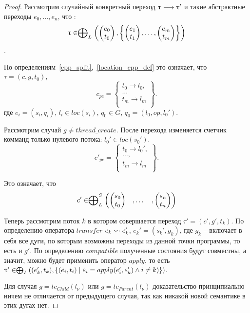 \begin{proof}
Рассмотрим случайный конкретный переход $\uptau \longrightarrow \uptau'$ и такие абстрактные переходы $e_0, \dots, e_n$, что :
$$\uptau \in \mathrel{\bigoplus}_{L}
\left(
\begin{pmatrix}
e_0 \\
t_0 
\end{pmatrix},
\left\{
\begin{pmatrix}
e_1 \\
t_1 
\end{pmatrix},
\dots ,
\begin{pmatrix}
e_m \\
t_m 
\end{pmatrix}
\right\}
\right)$$.

По определениям~\ref{epp_split},~\ref{location_epp_def} это означает, что $\tau = (c, g, t_0)$,  
$$ c_{pc} = 
\left\lbrace
\begin{array}{c}
t_0 \to l_0,\\
\dots\\
t_m \to l_m\\
\end{array}
\right\rbrace.$$
где $e_i = (s_i, q_i)$, $l_i \in loc(s_i)$, $q_0 \in G$, $q_0 = (l_0, op, l_0')$.

Рассмотрим случай $g \neq thread\_create$. После перехода изменяется счетчик комманд только нулевого потока: $l_0' \in loc(s_0')$. $$ c'_{pc} = 
\left\lbrace
\begin{array}{c}
t_0 \to l_0',\\
\dots,\\
t_m \to l_m\\
\end{array}
\right\rbrace.$$

Это означает, что $$c' \in \mathrel{\bigoplus}^S_L 
\begin{pmatrix}
\begin{pmatrix}
s_0 \\
t_0 
\end{pmatrix}& ,
\dots& ,
\begin{pmatrix}
s_n \\
t_n 
\end{pmatrix}
\end{pmatrix}$$

Теперь рассмотрим поток $k$ в котором совершается переход $\tau' = (c', g', t_k)$. 
По определению оператора $transfer$ $e_k \leadsto e_k'$, $e_k' = (s_k', g_k)$, где $g_k$ -- включает в себя все дуги, по которым возможны переходы из данной точки программы, то есть и $g'$. 
По определению $compatible$ полученные состояния будут совместны, а значит, можно будет применить оператор $apply$, то есть
$\uptau' \in \mathrel{\bigoplus}_I((e_k', t_k), \{(\tilde{e}_i, t_i) \mid \tilde{e}_i = apply(e_i', e'_k) \land i \neq k)\})$.

Для случая $g = tc_{Child}(l_\nu)$ или $g = tc_{Parent}(l_\nu)$ доказательство принципиально ничем не отличается от предыдущего случая, так как никакой новой семантике в этих дугах нет. 
\end{proof}

